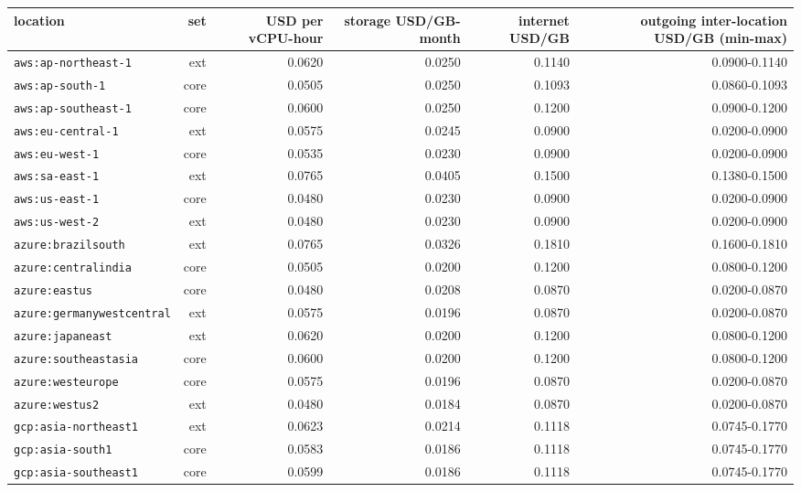 \begin{table}[t]
\centering
\small
\begin{tabular}{lrrrrr}
\toprule
location & set & USD per vCPU-hour & storage USD/GB-month & internet USD/GB & outgoing inter-location USD/GB (min-max) \\
\midrule
\texttt{aws:ap-northeast-1} & ext & 0.0620 & 0.0250 & 0.1140 & 0.0900-0.1140 \\
\texttt{aws:ap-south-1} & core & 0.0505 & 0.0250 & 0.1093 & 0.0860-0.1093 \\
\texttt{aws:ap-southeast-1} & core & 0.0600 & 0.0250 & 0.1200 & 0.0900-0.1200 \\
\texttt{aws:eu-central-1} & ext & 0.0575 & 0.0245 & 0.0900 & 0.0200-0.0900 \\
\texttt{aws:eu-west-1} & core & 0.0535 & 0.0230 & 0.0900 & 0.0200-0.0900 \\
\texttt{aws:sa-east-1} & ext & 0.0765 & 0.0405 & 0.1500 & 0.1380-0.1500 \\
\texttt{aws:us-east-1} & core & 0.0480 & 0.0230 & 0.0900 & 0.0200-0.0900 \\
\texttt{aws:us-west-2} & ext & 0.0480 & 0.0230 & 0.0900 & 0.0200-0.0900 \\
\texttt{azure:brazilsouth} & ext & 0.0765 & 0.0326 & 0.1810 & 0.1600-0.1810 \\
\texttt{azure:centralindia} & core & 0.0505 & 0.0200 & 0.1200 & 0.0800-0.1200 \\
\texttt{azure:eastus} & core & 0.0480 & 0.0208 & 0.0870 & 0.0200-0.0870 \\
\texttt{azure:germanywestcentral} & ext & 0.0575 & 0.0196 & 0.0870 & 0.0200-0.0870 \\
\texttt{azure:japaneast} & ext & 0.0620 & 0.0200 & 0.1200 & 0.0800-0.1200 \\
\texttt{azure:southeastasia} & core & 0.0600 & 0.0200 & 0.1200 & 0.0800-0.1200 \\
\texttt{azure:westeurope} & core & 0.0575 & 0.0196 & 0.0870 & 0.0200-0.0870 \\
\texttt{azure:westus2} & ext & 0.0480 & 0.0184 & 0.0870 & 0.0200-0.0870 \\
\texttt{gcp:asia-northeast1} & ext & 0.0623 & 0.0214 & 0.1118 & 0.0745-0.1770 \\
\texttt{gcp:asia-south1} & core & 0.0583 & 0.0186 & 0.1118 & 0.0745-0.1770 \\
\texttt{gcp:asia-southeast1} & core & 0.0599 & 0.0186 & 0.1118 & 0.0745-0.1770 \\

\end{tabular}
\end{table}
